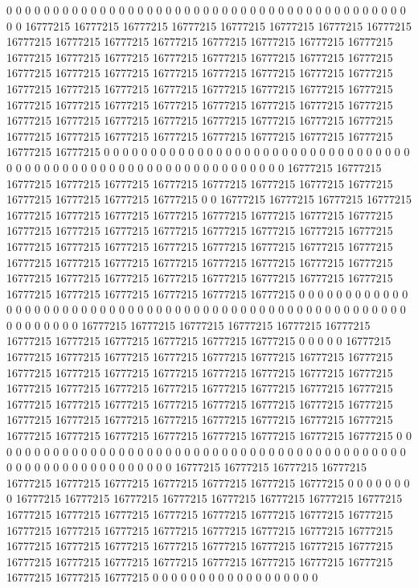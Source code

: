 0 0 0 0 0 0 0 0 0 0 0 0 0 0 0 0 0 0 0 0 0 0 0 0 0 0 0 0 0 0 0 0 0 0 0 0 0 0 0 0 0 0 0 0 0 16777215 16777215 16777215 16777215 16777215 16777215 16777215 16777215 16777215 16777215 16777215 16777215 16777215 16777215 16777215 16777215 16777215 16777215 16777215 16777215 16777215 16777215 16777215 16777215 16777215 16777215 16777215 16777215 16777215 16777215 16777215 16777215 16777215 16777215 16777215 16777215 16777215 16777215 16777215 16777215 16777215 16777215 16777215 16777215 16777215 16777215 16777215 16777215 16777215 16777215 16777215 16777215 16777215 16777215 16777215 16777215 16777215 16777215 16777215 16777215 16777215 16777215 16777215 16777215 16777215 16777215 0 0 0 0 0 0 0 0 0 0 0 0 0 0 0 0 0
0 0 0 0 0 0 0 0 0 0 0 0 0 0 0 0 0 0 0 0 0 0 0 0 0 0 0 0 0 0 0 0 0 0 0 0 0 0 0 0 0 0 0 0 0 0 16777215 16777215 16777215 16777215 16777215 16777215 16777215 16777215 16777215 16777215 16777215 16777215 16777215 16777215 0 0 16777215 16777215 16777215 16777215 16777215 16777215 16777215 16777215 16777215 16777215 16777215 16777215 16777215 16777215 16777215 16777215 16777215 16777215 16777215 16777215 16777215 16777215 16777215 16777215 16777215 16777215 16777215 16777215 16777215 16777215 16777215 16777215 16777215 16777215 16777215 16777215 16777215 16777215 16777215 16777215 16777215 16777215 16777215 16777215 16777215 16777215 16777215 16777215 16777215 16777215 0 0 0 0 0 0 0 0 0 0 0 0 0 0 0 0
0 0 0 0 0 0 0 0 0 0 0 0 0 0 0 0 0 0 0 0 0 0 0 0 0 0 0 0 0 0 0 0 0 0 0 0 0 0 0 0 0 0 0 0 0 0 0 16777215 16777215 16777215 16777215 16777215 16777215 16777215 16777215 16777215 16777215 16777215 16777215 0 0 0 0 0 16777215 16777215 16777215 16777215 16777215 16777215 16777215 16777215 16777215 16777215 16777215 16777215 16777215 16777215 16777215 16777215 16777215 16777215 16777215 16777215 16777215 16777215 16777215 16777215 16777215 16777215 16777215 16777215 16777215 16777215 16777215 16777215 16777215 16777215 16777215 16777215 16777215 16777215 16777215 16777215 16777215 16777215 16777215 16777215 16777215 16777215 16777215 16777215 16777215 0 0 0 0 0 0 0 0 0 0 0 0 0 0 0
0 0 0 0 0 0 0 0 0 0 0 0 0 0 0 0 0 0 0 0 0 0 0 0 0 0 0 0 0 0 0 0 0 0 0 0 0 0 0 0 0 0 0 0 0 0 0 0 16777215 16777215 16777215 16777215 16777215 16777215 16777215 16777215 16777215 16777215 16777215 0 0 0 0 0 0 0 0 16777215 16777215 16777215 16777215 16777215 16777215 16777215 16777215 16777215 16777215 16777215 16777215 16777215 16777215 16777215 16777215 16777215 16777215 16777215 16777215 16777215 16777215 16777215 16777215 16777215 16777215 16777215 16777215 16777215 16777215 16777215 16777215 16777215 16777215 16777215 16777215 16777215 16777215 16777215 16777215 16777215 16777215 16777215 0 0 0 0 0 0 0 0 0 0 0 0 0 0 0 0 0 0
